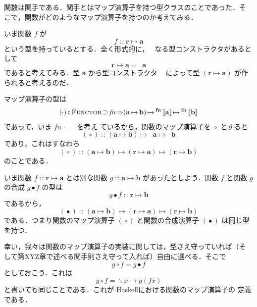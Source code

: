 \documentclass[a5paper,twoside,fleqn,draft]{jsbook}
\def\[{\left[\!\left[}
\def\]{\right]\!\right]}
\newcommand{\programminglanguage}[1]{\textsf{#1}}
\newcommand{\haskell}{\programminglanguage{Haskell}}
\DeclareMathOperator{\mSuperClass}{\Rightarrow}
\DeclareMathOperator{\mSuperSet}{\supset}
\DeclareMathOperator{\mComp}{\bullet} %
\DeclareMathOperator{\mIn}{{:\!:}}
\DeclareMathOperator{\mLambda}{\backslash}
\DeclareMathOperator{\mLambdaArrow}{\rightarrow}
\DeclareMathOperator{\mMap}{\cdot} %
\DeclareMathOperator{\mMapFunc}{\circ}
\DeclareMathOperator{\mMapsTo}{\mapsto}
\newcommand{\mType}[1]{\mathbf{#1}}
\newcommand{\mGenericTypeAssemble}[2]{{}^{\mType{#1}}\[\mType{#2}\]}
\newcommand{\mTypeConstructor}[1]{\textit{#1}}
\newcommand{\mFuncTypeConstructor}[1]{\mathop{\mTypeConstructor{Func}_{(\mType{#1})}}}
\newcommand{\mGenericTypeClass}[1]{\textsc{#1}} %
\newcommand{\mFunctorTypeClass}{\mGenericTypeClass{Functor}}
\newcommand{\mLambdaExp}[2]{\mLambda{#1}\mLambdaArrow{#2}}
\newcommand{\mProj}[2]{#1\mMapsTo#2}
\begin{document}
関数は関手である．関手とはマップ演算子を持つ型クラスのことであった．そ
こで，関数がどのようなマップ演算子を持つのか考えてみる．

いま関数 $f$ が
\begin{equation}
f\mIn\mProj{\mType{r}}{\mType{a}}
\end{equation}
という型を持っているとする．全く形式的に，$\mFuncTypeConstructor{r}$
なる型コンストラクタがあるとして
\begin{equation}
\mProj{\mType{r}}{\mType{a}}=\mFuncTypeConstructor{r}\mType{a}
\end{equation}
であると考えてみる．型 $\mType{a}$ から型コンストラクタ
$\mFuncTypeConstructor{r}$ によって型 $(\mProj{\mType{r}}{\mType{a}})$
が作られると考えるのだ．

マップ演算子の型は
\begin{equation}
(\mMap)\mIn{}\mFunctorTypeClass\mSuperSet\mTypeConstructor{fn}
  \mSuperClass\mProj{\mProj{(\mProj{\mType{a}}{\mType{b}})}
    {\mGenericTypeAssemble{fn}{a}}}{\mGenericTypeAssemble{fn}{b}}
\end{equation}
であって，いま $\mTypeConstructor{fn}=\mFuncTypeConstructor{r}$ を考え
ているから，関数のマップ演算子を $\mMapFunc$ とすると
\begin{equation}
  (\mMapFunc)\mIn{}\mProj{\mProj{(\mProj{\mType{a}}{\mType{b}})}
    {\mFuncTypeConstructor{r}\mType{a}}}{\mFuncTypeConstructor{r}\mType{b}}
\end{equation}
であり，これはすなわち
\begin{equation}
(\mMapFunc) \mIn{}\mProj{\mProj{(\mProj{\mType{a}}{\mType{b}})}
    {(\mProj{\mType{r}}{\mType{a}})}} {(\mProj{\mType{r}}{\mType{b}})}
\end{equation}
のことである．

いま関数 $f\mIn\mProj{\mType{r}}{\mType{a}}$ とは別な関数
$g\mIn\mProj{\mType{a}}{\mType{b}}$ があったとしよう．関数 $f$ と関数
$g$ の合成 $g\mComp f$ の型は
\begin{equation}
g\mComp f\mIn\mProj{\mType{r}}{\mType{b}}
\end{equation}
であるから，
\begin{equation}
(\mComp)\mIn{}\mProj{\mProj{(\mProj{\mType{a}}{\mType{b}})}{(\mProj{\mType{r}}{\mType{a}})}}
  {(\mProj{\mType{r}}{\mType{b}})}
\end{equation}
である．つまり関数のマップ演算子 $(\mMapFunc)$ と関数の合成演算子
$(\mComp)$ は同じ型を持つ．

幸い，我々は関数のマップ演算子の実装に関しては，型さえ守っていれば（そ
  して第XYZ章で述べる関手則さえ守って入れば）自由に選べる．そこで
\begin{equation}
g\mMapFunc f=g\mComp f
\end{equation}
としておこう．これは
\begin{equation}
g\mMapFunc f=\mLambdaExp{x}{g(fx)}
\end{equation}
と書いても同じことである．これが \haskell における関数のマップ演算子の
定義である．
\end{document}
